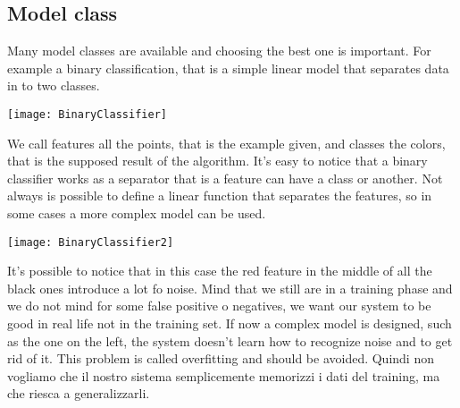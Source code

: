 \subsection{Model class}
Many model classes are available and choosing the best one is important. For example a binary classification, that is a simple linear model that separates data in to two classes. 
\begin{center}
	\texttt{[image: BinaryClassifier]}
\end{center}
We call features all the points, that is the example given, and classes the colors, that is the supposed result of the algorithm. It's easy to notice that a binary classifier works as a separator that is a feature can have a class or another. Not always is possible to define a linear function that separates the features, so in some cases a more complex model can be used. 
\begin{center}
	\texttt{[image: BinaryClassifier2]}
\end{center}
It's possible to notice that in this case the red feature in the middle of all the black ones introduce a lot fo noise. Mind that we still are in a training phase and we do not mind for some false positive o negatives, we want our system to be good in real life not in the training set. If now a complex model is designed, such as the one on the left, the system doesn't learn how to recognize noise and to get rid of it. This problem is called overfitting and should be avoided. \newline
Quindi non vogliamo che il nostro sistema semplicemente memorizzi i dati del training, ma che riesca a generalizzarli. 
